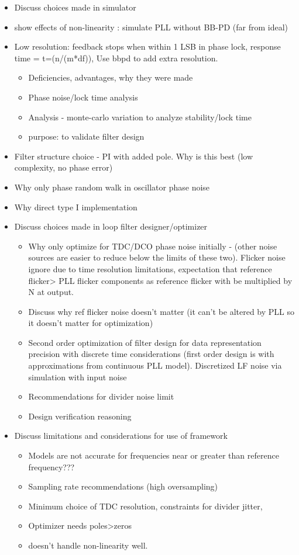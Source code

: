 \begin{itemize}
	\item Discuss choices made in simulator

	\item show effects of non-linearity : simulate PLL without BB-PD (far from ideal)

	\item Low resolution: feedback stops when within 1 LSB in phase lock, response time = t=(n/(m*df)), Use bbpd to add extra resolution.

	\begin{itemize}
		\item Deficiencies, advantages, why they were made
		\item Phase noise/lock time analysis
		\item Analysis - monte-carlo variation to analyze stability/lock time
		\item purpose: to validate filter design
	\end{itemize}
	\item Filter structure choice - PI with added pole. Why is this best (low complexity, no phase error)
	\item Why only phase random walk in oscillator phase noise
	\item Why direct type I implementation
	\item Discuss choices made in loop filter designer/optimizer
	\begin{itemize}
		\item Why only optimize for TDC/DCO phase noise initially - (other noise sources are easier to reduce below the limits of these two). Flicker noise ignore due to time resolution limitations, expectation that reference flicker> PLL flicker components as reference flicker with be multiplied by N at output.
		\item Discuss why ref flicker noise doesn't matter (it can't be altered by PLL so it doesn't matter for optimization)
		\item Second order optimization of filter design for data representation precision with discrete time considerations (first order design is with approximations from continuous PLL model). Discretized LF noise via simulation with input noise
		\item Recommendations for divider noise limit
		\item Design verification reasoning
	\end{itemize}
	\item Discuss limitations and considerations for use of framework
	\begin{itemize}
		\item Models are not accurate for frequencies near or greater than reference frequency???
		\item Sampling rate recommendations (high oversampling)
		\item Minimum choice of TDC resolution, constraints for divider jitter,
		\item Optimizer needs poles>zeros
		\item doesn't handle non-linearity well.
	\end{itemize}
\end{itemize}

